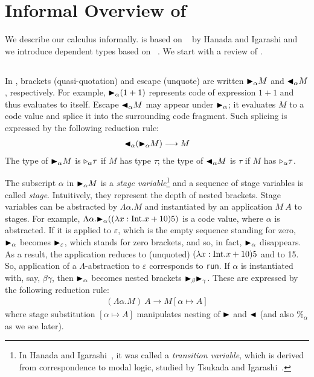 
\section{Informal Overview of \LMD \label{sec:informal-overview}}

We describe our calculus \LMD informally.  \LMD is based on
\LTP~\cite{Hanada2014} by Hanada and Igarashi and we introduce
dependent types based on \LLF~\cite{attapl}.  We start with a review of 
\LTP.

\subsection{\LTP}


In \LTP, brackets (quasi-quotation) and escape (unquote) are written
${\mathop{\blacktriangleright}}_\alpha M$ and ${\mathop{\blacktriangleleft}}_\alpha M$, respectively.  For example,
${\mathop{\blacktriangleright}}_\alpha (1 + 1)$ represents code of expression $1 + 1$ and thus
evaluates to itself.  Escape ${\mathop{\blacktriangleleft}}_\alpha M$ may appear under
${\mathop{\blacktriangleright}}_\alpha$; it evaluates $M$ to a code value and splice it into the
surrounding code fragment.  Such splicing is expressed by the
following reduction rule:
\begin{align*}
	{\mathop{\blacktriangleleft}}_\alpha ({\mathop{\blacktriangleright}}_\alpha M) \longrightarrow M 
\end{align*}
The type of
${\mathop{\blacktriangleright}}_\alpha M$ is ${\mathop{\triangleright}}_\alpha \tau$ if $M$ has type $\tau$; the type
of ${\mathop{\blacktriangleleft}}_\alpha M$ is $\tau$ if $M$ has ${\mathop{\triangleright}}_\alpha \tau$.

The subscript $\alpha$ in ${\mathop{\blacktriangleright}}_\alpha M$ is a \textit{stage
  variable}\footnote{%
  In Hanada and Igarashi~\cite{Hanada2014}, it was called a
  \textit{transition variable}, which is derived from correspondence
  to modal logic, studied by Tsukada and Igarashi~\cite{Tsukada}.} and
a sequence of stage variables is called \textit{stage}.  Intuitively,
they represent the depth of nested brackets.  Stage variables can be
abstracted by $\Lambda\alpha.M$ and instantiated by an application
$M\ A$ to stages.  For example,
$\Lambda\alpha.{\mathop{\blacktriangleright}}_\alpha ((\lambda x:\textrm{Int}.x+10) 5)$ is a code value,
where \(\alpha\) is abstracted.  If it is applied to \(\varepsilon\),
which is the empty sequence standing for zero, \({\mathop{\blacktriangleright}}_\alpha\) becomes
\({\mathop{\blacktriangleright}}_\varepsilon\), which stands for zero brackets, and so, in fact,
\({\mathop{\blacktriangleright}}_\alpha\) disappears.  As a result, the application reduces to
(unquoted) \((\lambda x:\textrm{Int}.x+10) 5\) and to 15.  So, application of a
\(\Lambda\)-abstraction to $\varepsilon$ corresponds to \texttt{run}.
If \(\alpha\) is instantiated with, say, \(\beta\gamma\), then
\({\mathop{\blacktriangleright}}_\alpha\) becomes nested brackets \({\mathop{\blacktriangleright}}_{\beta} {\mathop{\blacktriangleright}}_\gamma\).
These are expressed by the following reduction rule:
\begin{align*}
	(\Lambda\alpha.M)\ A \longrightarrow M[\alpha\mapsto A]
\end{align*}
where stage substitution \([\alpha \mapsto A]\) manipulates nesting of
\({\mathop{\blacktriangleright}}\) and \({\mathop{\blacktriangleleft}}\) (and also \(\%_\alpha\) as we see later).

